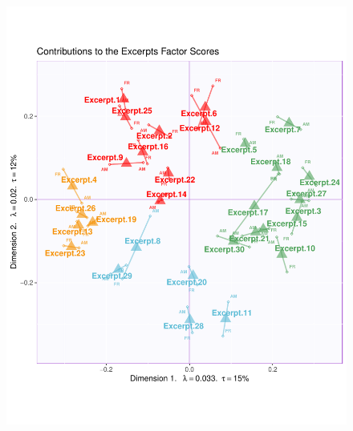 \documentclass[
  english,
  man,floatsintext]{apa6}
\begin{document}
\begin{figure}

{\centering \includegraphics{Music-Descriptor-Space_files/figure-latex/mfasbs-2} 

}

\caption{ }\label{fig:mfasbs-2}
\end{figure}
\end{document}
